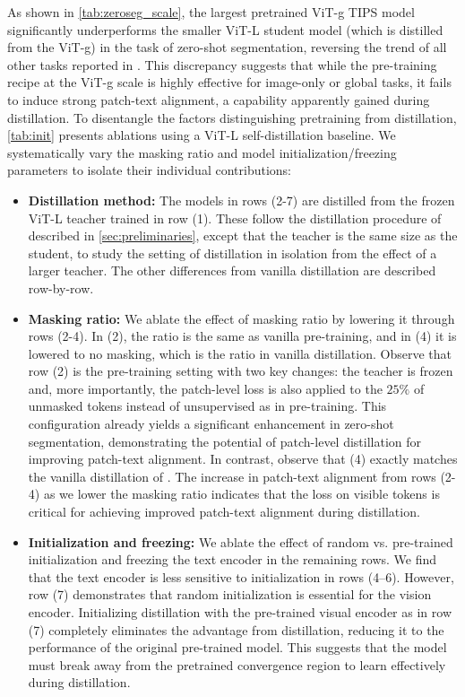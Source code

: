 As shown in \cref{tab:zeroseg_scale}, the largest pretrained ViT-g TIPS model significantly underperforms the smaller ViT-L student model (which is distilled from the ViT-g) in the task of zero-shot segmentation, reversing the trend of all other tasks reported in \citep{tips_paper}. 
This discrepancy suggests that while the pre-training recipe at the ViT-g scale is highly effective for image-only or global tasks, it fails to induce strong patch-text alignment, a capability apparently gained during distillation. 
To disentangle the factors distinguishing pretraining from distillation, \cref{tab:init} presents ablations using a ViT-L self-distillation baseline. We systematically vary the masking ratio and model initialization/freezing parameters to isolate their individual contributions:
\begin{itemize} 
\item  \textbf{Distillation method:} The models in rows (2-7) are distilled from the frozen ViT-L teacher trained in row (1). These follow the distillation procedure of \citep{tips_paper} described in \cref{sec:preliminaries}, except that the teacher is the same size as the student, to study the setting of distillation in isolation from the effect of a larger teacher. The other differences from vanilla distillation are described row-by-row.

\item \textbf{Masking ratio:} We ablate the effect of masking ratio by lowering it through rows (2-4). In (2), the ratio is the same as vanilla pre-training, and in (4) it is lowered to no masking, which is the ratio in vanilla distillation. Observe that row (2) is the pre-training setting with two key changes: the teacher is frozen and, more importantly, the patch-level loss is also applied to the $25\%$ of unmasked tokens instead of unsupervised as in pre-training. This configuration already yields a significant enhancement in zero-shot segmentation, demonstrating the potential of patch-level distillation for improving patch-text alignment. In contrast, observe that (4) exactly matches the vanilla distillation of \citep{tips_paper}. The increase in patch-text alignment from rows (2-4) as we lower the masking ratio indicates that the loss on visible tokens is critical for achieving improved patch-text alignment during distillation.

\item \textbf{Initialization and freezing:} We ablate the effect of random vs. pre-trained initialization and freezing the text encoder in the remaining rows. We find that the text encoder is less sensitive to initialization in rows (4–6). However, row (7) demonstrates that random initialization is essential for the vision encoder. Initializing distillation with the pre-trained visual encoder as in row (7) completely eliminates the advantage from distillation, reducing it to the performance of the original pre-trained model. This suggests that the model must break away from the pretrained convergence region to learn effectively during distillation.

\end{itemize}

